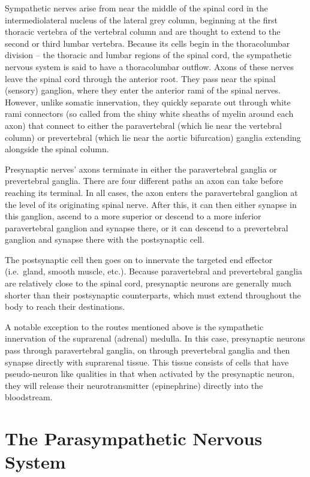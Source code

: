 \documentclass[]{book}
\begin{document}
Sympathetic nerves arise from near the middle of the spinal cord in the intermediolateral nucleus of the lateral grey column, beginning at the first thoracic vertebra of the vertebral column and are thought to extend to the second or third lumbar vertebra. Because its cells begin in the thoracolumbar division -- the thoracic and lumbar regions of the spinal cord, the sympathetic nervous system is said to have a thoracolumbar outflow. Axons of these nerves leave the spinal cord through the anterior root. They pass near the spinal (sensory) ganglion, where they enter the anterior rami of the spinal nerves. However, unlike somatic innervation, they quickly separate out through white rami connectors (so called from the shiny white sheaths of myelin around each axon) that connect to either the paravertebral (which lie near the vertebral column) or prevertebral (which lie near the aortic bifurcation) ganglia extending alongside the spinal column.

Presynaptic nerves' axons terminate in either the paravertebral ganglia or prevertebral ganglia. There are four different paths an axon can take before reaching its terminal. In all cases, the axon enters the paravertebral ganglion at the level of its originating spinal nerve. After this, it can then either synapse in this ganglion, ascend to a more superior or descend to a more inferior paravertebral ganglion and synapse there, or it can descend to a prevertebral ganglion and synapse there with the postsynaptic cell.

The postsynaptic cell then goes on to innervate the targeted end effector (i.e.~gland, smooth muscle, etc.). Because paravertebral and prevertebral ganglia are relatively close to the spinal cord, presynaptic neurons are generally much shorter than their postsynaptic counterparts, which must extend throughout the body to reach their destinations.

A notable exception to the routes mentioned above is the sympathetic innervation of the suprarenal (adrenal) medulla. In this case, presynaptic neurons pass through paravertebral ganglia, on through prevertebral ganglia and then synapse directly with suprarenal tissue. This tissue consists of cells that have pseudo-neuron like qualities in that when activated by the presynaptic neuron, they will release their neurotransmitter (epinephrine) directly into the bloodstream.

\hypertarget{the-parasympathetic-nervous-system}{%
\section{The Parasympathetic Nervous System}\label{the-parasympathetic-nervous-system}}
\end{document}
